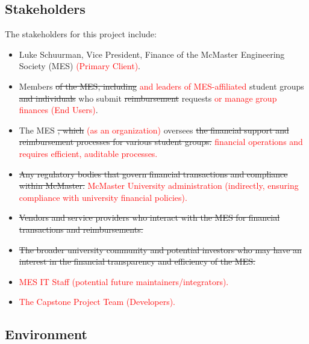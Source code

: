 \documentclass{article}
\begin{document}
\subsection{Stakeholders}

\hspace{0.5cm} The stakeholders for this project include:

\begin{itemize}
    \item Luke Schuurman, Vice President, Finance of the McMaster Engineering Society (MES) \textcolor{red}{(Primary Client)}.
    \item Members \sout{of the MES, including} \textcolor{red}{and leaders of MES-affiliated} student groups \sout{and individuals} who submit \sout{reimbursement} requests \textcolor{red}{or manage group finances (End Users)}.
    \item The MES \sout{, which} \textcolor{red}{(as an organization)} oversees \sout{the financial support and reimbursement processes for various student groups.} \textcolor{red}{financial operations and requires efficient, auditable processes.}
    \item \sout{Any regulatory bodies that govern financial transactions and compliance within McMaster.} \textcolor{red}{McMaster University administration (indirectly, ensuring compliance with university financial policies).}
    \item \sout{Vendors and service providers who interact with the MES for financial transactions and reimbursements.} %
    \item \sout{The broader university community and potential investors who may have an interest in the financial transparency and efficiency of the MES.} %
    \item \textcolor{red}{MES IT Staff (potential future maintainers/integrators).}
    \item \textcolor{red}{The Capstone Project Team (Developers).}
\end{itemize}

\subsection{Environment}
\end{document}
